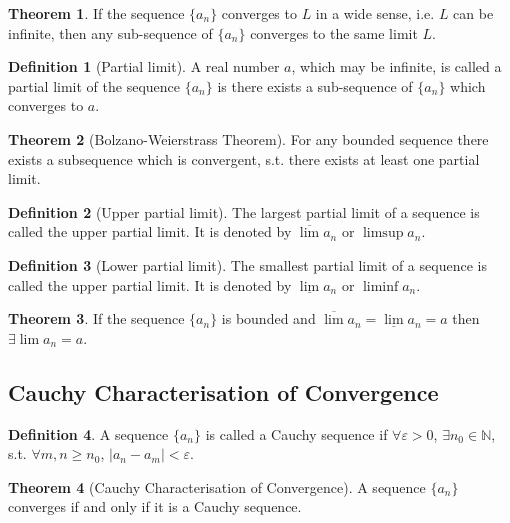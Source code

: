 \documentclass[fleqn, a4paper, 8pt, twoside]{amsart}
\theoremstyle{definition}
\theoremstyle{bluedefinition}
\newtheorem{definition}{Definition}
\theoremstyle{redtheorem}
\newtheorem{theorem}{Theorem}
\begin{document}
\begin{multicols}{2}
\begin{spacing}{0.7}
\begin{theorem}
	If the sequence $\{a_n\}$ converges to $L$ in a wide sense, i.e. $L$ can be infinite, then any sub-sequence of $\{a_n\}$ converges to the same limit $L$.
	\label{Any subsequence converges to the limit of the sequence}
\end{theorem}

\begin{definition}[Partial limit]
	A real number $a$, which may be infinite, is called a partial limit of the sequence $\{a_n\}$ is there exists a sub-sequence of $\{a_n\}$ which converges to $a$.
\end{definition}

\begin{theorem}[Bolzano-Weierstrass Theorem]
	For any bounded sequence there exists a subsequence which is convergent, s.t. there exists at least one partial limit.
	\label{Bolzano-Weierstrass Theorem}
\end{theorem}

\begin{definition}[Upper partial limit]
	The largest partial limit of a sequence is called the upper partial limit.
	It is denoted by $\overline{\lim} a_n$ or $\limsup a_n$.
\end{definition}

\begin{definition}[Lower partial limit]
	The smallest partial limit of a sequence is called the upper partial limit.
	It is denoted by $\underline{\lim} a_n$ or $\liminf a_n$.
\end{definition}

\begin{theorem}
	If the sequence $\{a_n\}$ is bounded and $\overline{\lim} a_n = \underline{\lim} a_n = a$ then $\exists \lim a_n = a$.
	\label{Equal upper and lower partial limits imply existence of limit}
\end{theorem}

\subsection{Cauchy Characterisation of Convergence}

\begin{definition}
	A sequence $\{a_n\}$ is called a Cauchy sequence if $\forall \varepsilon > 0$, $\exists n_0 \in \mathbb{N}$, s.t. $\forall m, n \geq n_0$, $|a_n - a_m| < \varepsilon$.
\end{definition}

\begin{theorem}[Cauchy Characterisation of Convergence]
	A sequence $\{a_n\}$ converges if and only if it is a Cauchy sequence.
	\label{Cauchy Characterisation of Convergence}
\end{theorem}


\end{spacing}
\end{multicols}
\end{document}
